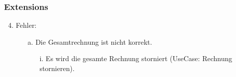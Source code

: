 \documentclass[./detailed_overview_usecases.tex]{subfiles}
\begin{document}
    \subsubsection*{Extensions}
    \begin{enumerate}
        \setcounter{enumi}{3}
        \item Fehler:
        \begin{itemize}
            \item[a.] Die Gesamtrechnung ist nicht korrekt.
            \begin{itemize}
                \item[i.] Es wird die gesamte Rechnung storniert (UseCase: Rechnung stornieren).
            \end{itemize}
        \end{itemize}
    \end{enumerate}
\end{document}
